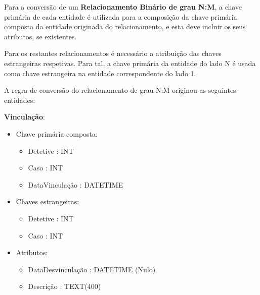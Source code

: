 \documentclass[a4paper,12pt]{scrreprt}
\begin{document}
        \vspace{0.5cm}
        
        Para a conversão de um \textbf{Relacionamento Binário de grau N:M}, a chave primária de cada entidade é utilizada para a composição da chave primária composta da entidade originada do relacionamento, e esta deve incluir os seus atributos, se existentes.

        Para os restantes relacionamentos é necessário a atribuição das chaves estrangeiras respetivas. Para tal, a chave primária da entidade do lado N é usada como chave estrangeira na entidade correspondente do lado 1.

        A regra de conversão do relacionamento de grau N:M originou as seguintes entidades:
        
        \textbf{Vinculação}:
        \begin{itemize}
            \item Chave primária composta:
                \begin{itemize}
                    \item Detetive : INT
                    \item Caso : INT
                    \item DataVinculação : DATETIME
                \end{itemize}
            \item Chaves estrangeiras:
                \begin{itemize}
                    \item Detetive : INT
                    \item Caso : INT
                \end{itemize}
            \item Atributos:
                \begin{itemize} 
                    \item DataDesvinculação : DATETIME (Nulo)
                    \item Descrição : TEXT(400)
                \end{itemize}
        \end{itemize}


        \clearpage
\end{document}
